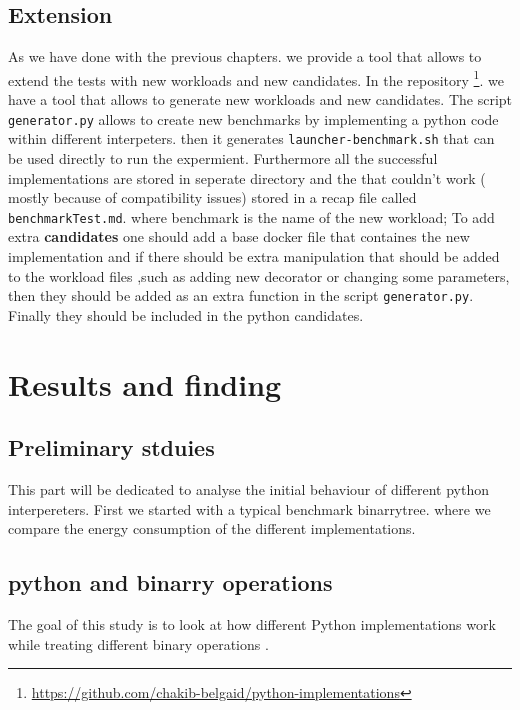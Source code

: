 \subsection{Extension}
As we have done with the previous chapters. we provide a tool that allows to extend the tests with new workloads and new candidates.
In the repository \footnote{\url{https://github.com/chakib-belgaid/python-implementations}}.
we have a tool that allows to generate new workloads and new candidates.
The script \texttt{generator.py} allows to create new benchmarks by implementing a python code within different interpeters. then it generates \texttt{launcher-benchmark.sh} that can be used directly to run the expermient. Furthermore all the successful implementations are stored in seperate directory and the that couldn't work ( mostly because of compatibility issues) stored in a recap file called \texttt{benchmarkTest.md}. where benchmark is the name of the new workload;
To add extra \textbf{candidates} one should add a base docker file
that containes the new implementation and if there should be extra manipulation that should be added to the workload files ,such as adding new decorator or changing some parameters, then they should be added as an extra function in the script \texttt{generator.py}. Finally they should be included in the python candidates.

\section{Results and finding}

\subsection{Preliminary stduies}
This part will be dedicated to analyse the initial behaviour of different python interpereters.
First we started with a typical benchmark binarrytree. where we compare the energy consumption of the different implementations.

\subsection{python and binarry operations }
The goal of this study is to look at how different Python implementations work while treating different binary operations .



